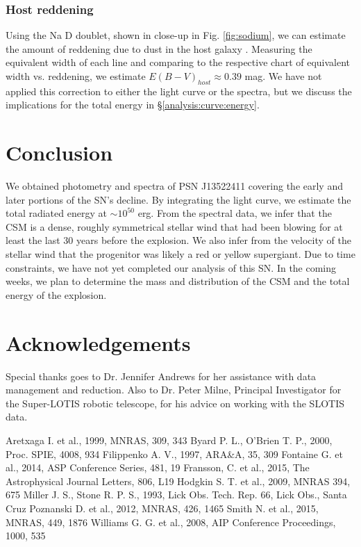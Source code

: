\documentclass[iop]{emulateapj}
\begin{document}
\subsubsection{Host reddening} \label{analysis:spec:red}
Using the Na D doublet, shown in close-up in Fig. \ref{fig:sodium}, we can estimate the amount of reddening due to dust in the host galaxy \citep{Poz12}. Measuring the equivalent width of each line and comparing to the respective chart of equivalent width vs. reddening, we estimate $E(B-V)_{host} \approx 0.39$ mag. We have not applied this correction to either the light curve or the spectra, but we discuss the implications for the total energy in \S \ref{analysis:curve:energy}.

\section{Conclusion} \label{conclusion}
We obtained photometry and spectra of PSN J13522411 covering the early and later portions of the SN's decline. By integrating the light curve, we estimate the total radiated energy at $\sim10^{50}$ erg. From the spectral data, we infer that the CSM is a dense, roughly symmetrical stellar wind that had been blowing for at least the last 30 years before the explosion. We also infer from the velocity of the stellar wind that the progenitor was likely a red or yellow supergiant. Due to time constraints, we have not yet completed our analysis of this SN. In the coming weeks, we plan to determine the mass and distribution of the CSM and the total energy of the explosion.

\section{Acknowledgements}
Special thanks goes to Dr. Jennifer Andrews for her assistance with data management and reduction. Also to Dr. Peter Milne, Principal Investigator for the Super-LOTIS robotic telescope, for his advice on working with the SLOTIS data.

\begin{thebibliography}{}
 Aretxaga I. et al., 1999, MNRAS, 309, 343
 Byard P. L., O'Brien T. P., 2000, Proc. SPIE, 4008, 934
 Filippenko A. V., 1997, ARA\&A, 35, 309
 Fontaine G. et al., 2014, ASP Conference Series, 481, 19
 Fransson, C. et al., 2015, The Astrophysical Journal Letters, 806, L19
 Hodgkin S. T. et al., 2009, MNRAS 394, 675
 Miller J. S., Stone R. P. S., 1993, Lick Obs. Tech. Rep. 66, Lick Obs., Santa Cruz
 Poznanski D. et al., 2012, MNRAS, 426, 1465
 Smith N. et al., 2015, MNRAS, 449, 1876
 Williams G. G. et al., 2008, AIP Conference Proceedings, 1000, 535
\end{thebibliography}
\end{document}
